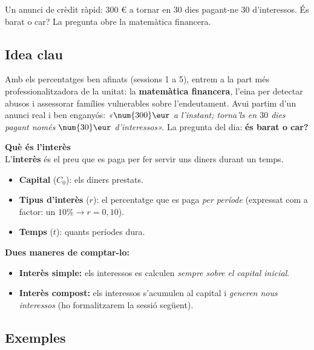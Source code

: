 %
{Un anunci de crèdit ràpid: 300 € a tornar en 30 dies pagant-ne 30 d'interessos. És barat o car? La pregunta obre la matemàtica financera.}

\subsection{Idea clau}

Amb els percentatges ben afinats (sessions 1 a 5), entrem a la part més
professionalitzadora de la unitat: la \textbf{matemàtica financera}, l'eina per
detectar abusos i assessorar famílies vulnerables sobre l'endeutament. Avui partim
d'un anunci real i ben enganyós: \emph{«$\num{300}\eur$ a l'instant; torna'ls en $30$
dies pagant només $\num{30}\eur$ d'interessos».} La pregunta del dia: \textbf{és barat
o car?}

\begin{idea}
\textbf{Què és l'interès}\\
L'\textbf{interès} és el preu que es paga per fer servir uns diners durant un temps.
\begin{itemize}[leftmargin=1.4em, itemsep=2pt]
  \item \textbf{Capital} ($C_0$): els diners prestats.
  \item \textbf{Tipus d'interès} ($r$): el percentatge que es paga \emph{per període}
        (expressat com a factor: un $10\%\rightarrow r=0,10$).
  \item \textbf{Temps} ($t$): quants períodes dura.
\end{itemize}
\textbf{Dues maneres de comptar-lo:}
\begin{itemize}[leftmargin=1.4em, itemsep=1pt]
  \item \textbf{Interès simple:} els interessos es calculen \emph{sempre sobre el
        capital inicial}.
  \item \textbf{Interès compost:} els interessos s'acumulen al capital i
        \emph{generen nous interessos} (ho formalitzarem la sessió següent).
\end{itemize}
\end{idea}

\subsection{Exemples}


